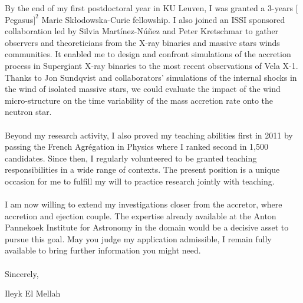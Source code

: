 \documentclass[12pt]{letter}
\begin{document}
\begin{letter} {}
\newpage 


\hspace*{0.5cm} By the end of my first postdoctoral year in KU Leuven, I was granted a 3-years $[$Pegasus$]^2$ Marie Sk\l{}odowska-Curie fellowship. I also joined an ISSI sponsored collaboration led by Silvia Mart\'{i}nez-N\'{u}\~{n}ez and Peter Kretschmar to gather observers and theoreticians from the X-ray binaries and massive stars winds communities. It enabled me to design and confront simulations of the accretion process in Supergiant X-ray binaries to the most recent observations of Vela X-1. Thanks to Jon Sundqvist and collaborators' simulations of the internal shocks in the wind of isolated massive stars, we could evaluate the impact of the wind micro-structure on the time variability of the mass accretion rate onto the neutron star.\\ \\
\hspace*{0.5cm} Beyond my research activity, I also proved my teaching abilities first in 2011 by passing the French Agr\'egation in Physics where I ranked second in 1,500 candidates. Since then, I regularly volunteered to be granted teaching responsibilities in a wide range of contexts. The present position is a unique occasion for me to fulfill my will to practice research jointly with teaching.\\ \\
\hspace*{0.5cm} I am now willing to extend my investigations closer from the accretor, where accretion and ejection couple. The expertise already available at the Anton Pannekoek Institute for Astronomy in the domain would be a decisive asset to pursue this goal. May you judge my application admissible, I remain fully available to bring further information you might need.\\ \\
 
Sincerely,
 
\closing{Ileyk El Mellah} 


  \end{letter}
  
  
 
\end{document}
